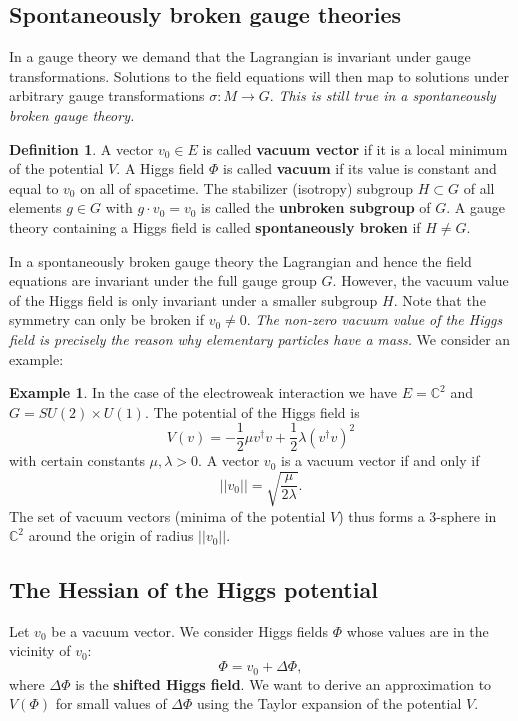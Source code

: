 \documentclass[11pt]{amsart}
\theoremstyle{definition}
\newtheorem{ex}[thm]{Example}
\newtheorem{defn}[thm]{Definition}
\theoremstyle{remark}
\numberwithin{equation}{section}
\begin{document}
\subsection{Spontaneously broken gauge theories}
In a gauge theory we demand that the Lagrangian is invariant under gauge transformations. Solutions to the field equations will then map to solutions under arbitrary gauge transformations $\sigma\colon M\rightarrow G$. {\em This is still true in a spontaneously broken gauge theory.} 
\begin{defn} A vector $v_0\in E$ is called {\bf vacuum vector} if it is a local minimum of the potential $V$. A Higgs field $\Phi$ is called {\bf vacuum} if its value is constant and equal to $v_0$ on all of spacetime. The stabilizer (isotropy) subgroup $H\subset G$ of all elements $g\in G$ with $g\cdot v_0=v_0$ is called the {\bf unbroken subgroup} of $G$. A gauge theory containing a Higgs field is called {\bf spontaneously broken} if $H\neq G$.
\end{defn}
In a spontaneously broken gauge theory the Lagrangian and hence the field equations are invariant under the full gauge group $G$. However, the vacuum value of the Higgs field is only invariant under a smaller subgroup $H$. Note that the symmetry can only be broken if $v_0\neq 0$. {\em The non-zero vacuum value of the Higgs field is precisely the reason why elementary particles have a mass.} We consider an example:

\begin{ex}\label{ex Higgs field potential} In the case of the electroweak interaction we have $E=\mathbb{C}^2$ and $G=SU(2)\times U(1)$. The potential of the Higgs field is
\begin{equation*}
V(v)=-\frac{1}{2}\mu v^\dagger v+\frac{1}{2}\lambda\left(v^\dagger v\right)^2
\end{equation*}
with certain constants $\mu,\lambda>0$. A vector $v_0$ is a vacuum vector if and only if 
\begin{equation*}
||v_0||=\sqrt{\frac{\mu}{2\lambda}}.
\end{equation*} 
The set of vacuum vectors (minima of the potential $V$) thus forms a 3-sphere in $\mathbb{C}^2$ around the origin of radius $||v_0||$.
\end{ex}

\subsection{The Hessian of the Higgs potential}
Let $v_0$ be a vacuum vector. We consider Higgs fields $\Phi$ whose values are in the vicinity of $v_0$:
\begin{equation*}
\Phi=v_0+\Delta\Phi,
\end{equation*} 
where $\Delta\Phi$ is the {\bf shifted Higgs field}. We want to derive an approximation to $V(\Phi)$ for small values of $\Delta\Phi$ using the Taylor expansion of the potential $V$.
\end{document}
